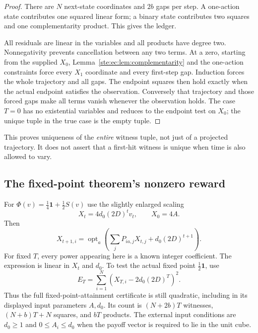 \documentclass[11pt,letterpaper]{article}
\theoremstyle{definition}
\theoremstyle{remark}
\newcommand{\one}{\mathbf 1}
\newcommand{\opt}{\operatorname{opt}}
\begin{document}
\begin{proof}
There are $N$ next-state coordinates and $2b$ gaps per step. A one-action
state contributes one squared linear form; a binary state contributes
two squares and one complementarity product. This gives the ledger.

All residuals are linear in the variables and all products have degree
two. Nonnegativity prevents cancellation between any two terms. At a
zero, starting from the supplied $X_0$, Lemma~\ref{ste:ec:lem:complementarity}
and the one-action constraints force every $X_1$ coordinate and every
first-step gap. Induction forces the whole trajectory and all gaps.
The endpoint squares then hold exactly when the actual endpoint satisfies
the observation. Conversely that trajectory and those forced gaps make
all terms vanish whenever the observation holds. The case $T=0$ has no
existential variables and reduces to the endpoint test on $X_0$; the
unique tuple in the true case is the empty tuple.
\end{proof}

This proves uniqueness of the \emph{entire} witness tuple, not just of a
projected trajectory. It does not assert that a first-hit witness is
unique when time is also allowed to vary.

\subsection{The fixed-point theorem's nonzero reward}

For $\Phi(v)=\tfrac14\one+\tfrac12S(v)$ use the slightly enlarged scaling
\begin{equation}
 X_t=4d_0(2D)^tv_t,\qquad X_0=4A.
 \label{ste:ec:eq:integer-scale-affine}
\end{equation}
Then
\begin{equation}
 X_{t+1,i}=\opt_a\left(\sum_jP_{ia,j}X_{t,j}
                    +d_0(2D)^{t+1}\right).
 \label{ste:ec:eq:affine-integer-recurrence}
\end{equation}
For fixed $T$, every power appearing here is a known integer coefficient.
The expression is linear in $X_t$ and $d_0$. To test the actual fixed
point $\tfrac12\one$, use
\begin{equation}
 E_T=\sum_{i=1}^N
       \left(X_{T,i}-2d_0(2D)^T\right)^2.
 \label{ste:ec:eq:fixed-endpoint}
\end{equation}
Thus the full fixed-point-attainment certificate is still quadratic,
including in its displayed input parameters $A,d_0$. Its count is
$(N+2b)T$ witnesses, $(N+b)T+N$ squares, and $bT$ products.
The external input conditions are $d_0\geq1$ and $0\leq A_i\leq d_0$
when the payoff vector is required to lie in the unit cube.
\end{document}
